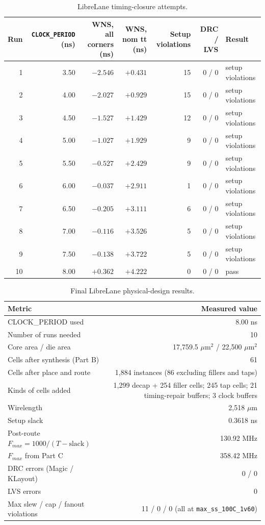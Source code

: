 \documentclass[10pt,a4paper]{article}
\newcommand{\code}[1]{\texttt{#1}}
\begin{document}
\begin{table}[h]
\centering\small
\caption{LibreLane timing-closure attempts.}\label{tab:runs}
\begin{tabular}{@{}rrrrrrl@{}}
\toprule
Run & \code{CLOCK\_PERIOD} (ns) & WNS, all corners (ns) & WNS, nom tt (ns) & Setup violations & DRC / LVS & Result \\
\midrule
1 & 3.50 & $-2.546$ & $+0.431$ & 15 & 0 / 0 & setup violations \\
2 & 4.00 & $-2.027$ & $+0.929$ & 15 & 0 / 0 & setup violations \\
3 & 4.50 & $-1.527$ & $+1.429$ & 12 & 0 / 0 & setup violations \\
4 & 5.00 & $-1.027$ & $+1.929$ & 9 & 0 / 0 & setup violations \\
5 & 5.50 & $-0.527$ & $+2.429$ & 9 & 0 / 0 & setup violations \\
6 & 6.00 & $-0.037$ & $+2.911$ & 1 & 0 / 0 & setup violations \\
7 & 6.50 & $-0.205$ & $+3.111$ & 6 & 0 / 0 & setup violations \\
8 & 7.00 & $-0.116$ & $+3.526$ & 5 & 0 / 0 & setup violations \\
9 & 7.50 & $-0.138$ & $+3.722$ & 5 & 0 / 0 & setup violations \\
10 & 8.00 & $+0.362$ & $+4.222$ & 0 & 0 / 0 & pass \\
\bottomrule
\end{tabular}
\end{table}

\begin{table}[h]
\centering\small
\caption{Final LibreLane physical-design results.}\label{tab:pnr}
\begin{tabular}{@{}lr@{}}
\toprule
Metric & Measured value \\
\midrule
CLOCK\_PERIOD used & 8.00 ns \\
Number of runs needed & 10 \\
Core area / die area & 17,759.5 $\mu$m$^2$ / 22,500 $\mu$m$^2$ \\
Cells after synthesis (Part B) & 61 \\
Cells after place and route & 1,884 instances (86 excluding fillers and taps) \\
Kinds of cells added & 1,299 decap + 254 filler cells; 245 tap cells; 21 timing-repair buffers; 3 clock buffers \\
Wirelength & 2,518 $\mu$m \\
Setup slack & 0.3618 ns \\
Post-route $F_{max}=1000/(T-\mathrm{slack})$ & 130.92 MHz \\
$F_{max}$ from Part C & 358.42 MHz \\
DRC errors (Magic / KLayout) & 0 / 0 \\
LVS errors & 0 \\
Max slew / cap / fanout violations & 11 / 0 / 0 (all at \code{max\_ss\_100C\_1v60}) \\
\bottomrule
\end{tabular}
\end{table}
\end{document}
